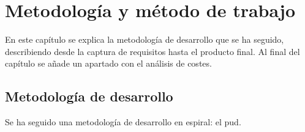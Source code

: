\chapter{Metodología y método de trabajo}
\label{cap:MiMetodologia}

En este capítulo se explica la metodología de desarrollo que se ha seguido, describiendo desde la captura de requisitos hasta el producto final. Al final del capítulo se añade un apartado con el análisis de costes.

\section{Metodología de desarrollo}

Se ha seguido una metodología de desarrollo en espiral: el \gls{pud}.

